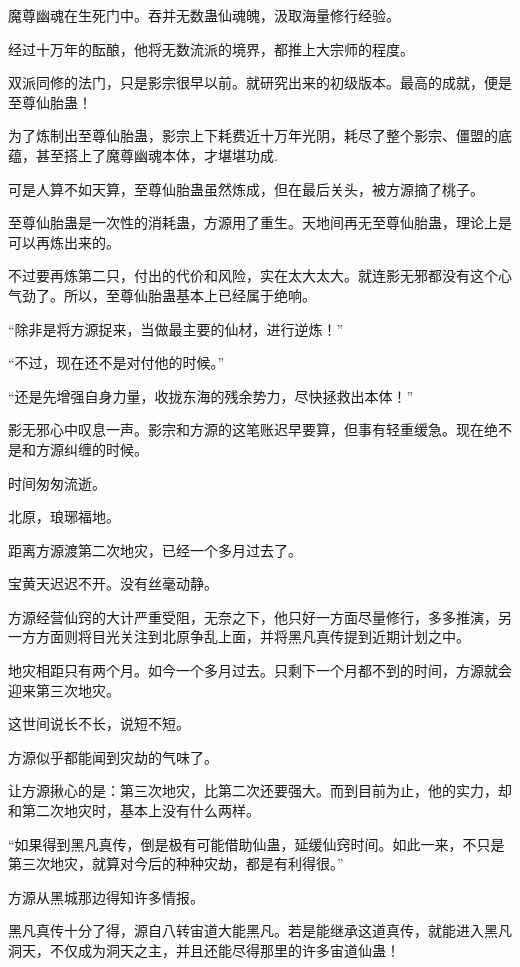 \begin{this_body}
魔尊幽魂在生死门中。吞并无数蛊仙魂魄，汲取海量修行经验。

经过十万年的酝酿，他将无数流派的境界，都推上大宗师的程度。

双派同修的法门，只是影宗很早以前。就研究出来的初级版本。最高的成就，便是至尊仙胎蛊！

为了炼制出至尊仙胎蛊，影宗上下耗费近十万年光阴，耗尽了整个影宗、僵盟的底蕴，甚至搭上了魔尊幽魂本体，才堪堪功成.

可是人算不如天算，至尊仙胎蛊虽然炼成，但在最后关头，被方源摘了桃子。

至尊仙胎蛊是一次性的消耗蛊，方源用了重生。天地间再无至尊仙胎蛊，理论上是可以再炼出来的。

不过要再炼第二只，付出的代价和风险，实在太大太大。就连影无邪都没有这个心气劲了。所以，至尊仙胎蛊基本上已经属于绝响。

“除非是将方源捉来，当做最主要的仙材，进行逆炼！”

“不过，现在还不是对付他的时候。”

“还是先增强自身力量，收拢东海的残余势力，尽快拯救出本体！”

影无邪心中叹息一声。影宗和方源的这笔账迟早要算，但事有轻重缓急。现在绝不是和方源纠缠的时候。

时间匆匆流逝。

北原，琅琊福地。

距离方源渡第二次地灾，已经一个多月过去了。

宝黄天迟迟不开。没有丝毫动静。

方源经营仙窍的大计严重受阻，无奈之下，他只好一方面尽量修行，多多推演，另一方方面则将目光关注到北原争乱上面，并将黑凡真传提到近期计划之中。

地灾相距只有两个月。如今一个多月过去。只剩下一个月都不到的时间，方源就会迎来第三次地灾。

这世间说长不长，说短不短。

方源似乎都能闻到灾劫的气味了。

让方源揪心的是：第三次地灾，比第二次还要强大。而到目前为止，他的实力，却和第二次地灾时，基本上没有什么两样。

“如果得到黑凡真传，倒是极有可能借助仙蛊，延缓仙窍时间。如此一来，不只是第三次地灾，就算对今后的种种灾劫，都是有利得很。”

方源从黑城那边得知许多情报。

黑凡真传十分了得，源自八转宙道大能黑凡。若是能继承这道真传，就能进入黑凡洞天，不仅成为洞天之主，并且还能尽得那里的许多宙道仙蛊！


\end{this_body}
